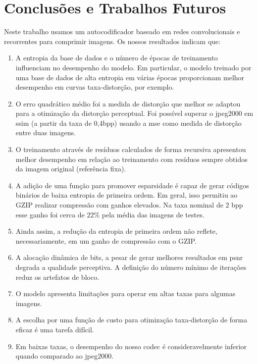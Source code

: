 \chapter{Conclusões e Trabalhos Futuros}

Neste trabalho usamos um autocodificador baseado em redes convolucionais e recorrentes para comprimir imagens. Os nossos resultados indicam que:
\begin{enumerate}
	\item A entropia da base de dados e o número de épocas de treinamento influenciam no desempenho do modelo. Em particular, o modelo treinado por uma base de dados de alta entropia em várias épocas proporcionam melhor desempenho em curvas taxa-distorção, por exemplo.  
	\item O erro quadrático médio foi a medida de distorção que melhor se adaptou para a otimização da distorção perceptual. Foi possível superar o \acrshort{jpeg}2000 em \acrshort{ssim} (a partir da taxa de 0,4bpp) usando a \acrshort{mse} como medida de distorção entre duas imagens. 
	\item O treinamento através de resíduos calculados de forma recursiva apresentou melhor desempenho em relação ao treinamento com resíduos sempre obtidos da imagem original (referência fixa).
	\item A adição de uma função para promover esparsidade é capaz de gerar códigos binários de baixa entropia de primeira ordem. Em geral, isso permitiu ao GZIP realizar compressão com ganhos elevados. Na taxa nominal de 2 bpp esse ganho foi cerca de 22\% pela média das imagens de testes.
	\item Ainda assim, a redução da entropia de primeira ordem não reflete, necessariamente, em um ganho de compressão com o GZIP.		
	\item A alocação dinâmica de bits, a pesar de gerar melhores resultados em \acrshort{psnr} degrada a qualidade perceptiva. A definição do número mínimo de iterações reduz os artefatos de bloco.   
	\item O modelo apresenta limitações para operar em altas taxas para algumas imagens.
	\item A escolha por uma função de custo para otimização taxa-distorção de forma eficaz é uma tarefa difícil.
	\item Em baixas taxas, o desempenho do nosso \acrshort{codec} é consideravelmente inferior quando comparado ao \acrshort{jpeg}2000.        
	
\end{enumerate} 

